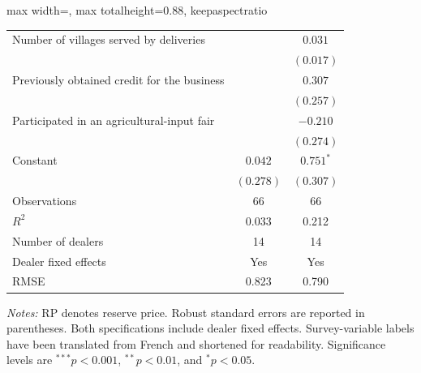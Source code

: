 \documentclass[11pt]{article}
\begin{document}
\begin{table}[!htbp]
\begin{adjustbox}{max width=\textwidth,
                  max totalheight=0.88\textheight,
                  keepaspectratio}
\begin{threeparttable}
\begin{tabular}{lcc}
Number of villages served by deliveries
    & & $0.031$ \\
    & & $(0.017)$ \\

Previously obtained credit for the business
    & & $0.307$ \\
    & & $(0.257)$ \\

Participated in an agricultural-input fair
    & & $-0.210$ \\
    & & $(0.274)$ \\

\addlinespace
Constant
    & $0.042$
    & $0.751^{*}$ \\
    & $(0.278)$
    & $(0.307)$ \\

\midrule
Observations
    & 66 & 66 \\
$R^{2}$
    & 0.033 & 0.212 \\
Number of dealers
    & 14 & 14 \\
Dealer fixed effects
    & Yes & Yes \\
RMSE
    & 0.823 & 0.790 \\
\bottomrule
\end{tabular}

\begin{tablenotes}[flushleft]
\footnotesize
\item \textit{Notes:} RP denotes reserve price. Robust standard errors are
reported in parentheses. Both specifications include dealer fixed effects.
Survey-variable labels have been translated from French and shortened for
readability. Significance levels are $^{***}p<0.001$,
$^{**}p<0.01$, and $^{*}p<0.05$.
\end{tablenotes}

\end{threeparttable}
\end{adjustbox}
\end{table}
\end{document}
